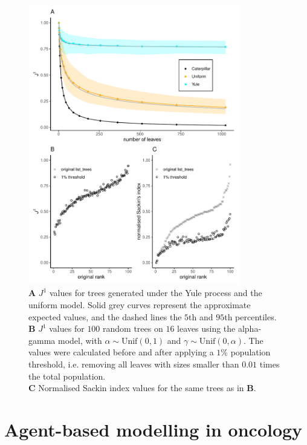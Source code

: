 \begin{figure}[h]
    \centering
    \includegraphics[width=0.82\textwidth]{Chapter_1/figures/old_j1_paper_figure.pdf}
    \caption{\textbf{A} $J^1$ values for trees generated under the Yule process and
    the uniform model. Solid grey curves represent the approximate expected values, and
    the dashed lines the $5$th and $95$th percentiles. \\
    \textbf{B} $J^1$ values for $100$ random
    trees on $16$ leaves using the alpha-gamma model, with $\alpha\sim \text{Unif}(0,1)$
    and $\gamma\sim \text{Unif}(0,\alpha)$. The values were
    calculated before and after applying a $1\%$ population threshold, i.e. removing all leaves
    with sizes smaller than $0.01$ times the total population.\\
    \textbf{C} Normalised Sackin index values for the same trees as in \textbf{B}.}
    \label{fig:robustness}
\end{figure}
\clearpage


\section{Agent-based modelling in oncology}

